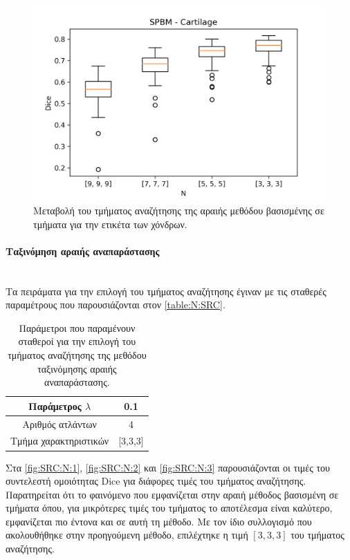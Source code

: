 \documentclass[a4paper,12pt]{article}
\newcommand{\paragraphLine}[1]{\paragraph{#1}\mbox{}\\}
\begin{document}
\begin{figure}[H]
    \centering
    \includegraphics[width=0.85\linewidth]{SPBM_N_Cartilage_plot.png}
    \caption{Μεταβολή του τμήματος αναζήτησης της αραιής μεθόδου βασισμένης σε
             τμήματα για την ετικέτα των χόνδρων.}
    \label{fig:SPBM:N:3}
\end{figure}

\paragraphLine{Ταξινόμηση αραιής αναπαράστασης}

Τα πειράματα για την επιλογή του τμήματος αναζήτησης έγιναν με τις σταθερές
παραμέτρους που παρουσιάζονται στον \autoref{table:N:SRC}.

\begin{table}[h!]
    \centering
    \begin{tabular}{|c|c|} 
        \hline
        Παράμετρος $\lambda$ & 0.1 \\ 
        \hline
        Αριθμός ατλάντων & 4 \\ 
        \hline
        Τμήμα χαρακτηριστικών & [3,3,3] \\ 
        \hline
    \end{tabular}
    \caption{Παράμετροι που παραμένουν σταθεροί για την επιλογή του τμήματος
             αναζήτησης της μεθόδου ταξινόμησης αραιής αναπαράστασης.}
    \label{table:N:SRC}
\end{table}

Στα \autoref{fig:SRC:N:1}, \autoref{fig:SRC:N:2} και \autoref{fig:SRC:N:3}
παρουσιάζονται οι τιμές του συντελεστή ομοιότητας Dice για διάφορες τιμές του
τμήματος αναζήτησης. Παρατηρείται ότι το φαινόμενο που εμφανίζεται στην αραιή
μέθοδος βασισμένη σε τμήματα όπου, για μικρότερες τιμές του τμήματος το
αποτέλεσμα είναι καλύτερο, εμφανίζεται πιο έντονα και σε αυτή τη μέθοδο. Με τον
ίδιο συλλογισμό που ακολουθήθηκε στην προηγούμενη μέθοδο, επιλέχτηκε η τιμή
$[3,3,3]$ του τμήματος αναζήτησης.
\end{document}
